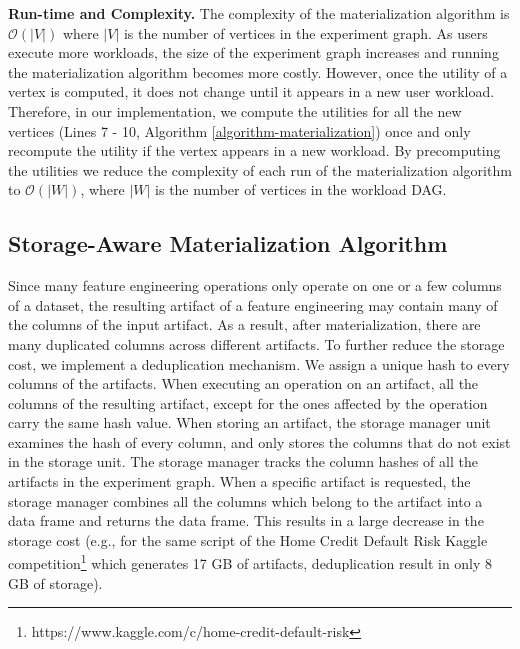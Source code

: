 \textbf{Run-time and Complexity.}
The complexity of the materialization algorithm is $\mathcal{O}(|V|)$ where $|V|$ is the number of vertices in the experiment graph.
As users execute more workloads, the size of the experiment graph increases and running the materialization algorithm becomes more costly.
However, once the utility of a vertex is computed, it does not change until it appears in a new user workload.
Therefore, in our implementation, we compute the utilities for all the new vertices (Lines 7 - 10, Algorithm \ref{algorithm-materialization}) once and only recompute the utility if the vertex appears in a new workload.
By precomputing the utilities we reduce the complexity of each run of the materialization algorithm to $\mathcal{O}(|W|)$, where $|W|$ is the number of vertices in the workload DAG.

\subsection{Storage-Aware Materialization Algorithm}
Since many feature engineering operations only operate on one or a few columns of a dataset, the resulting artifact of a feature engineering may contain many of the columns of the input artifact.
As a result, after materialization, there are many duplicated columns across different artifacts.
To further reduce the storage cost, we implement a deduplication mechanism.
We assign a unique hash to every columns of the artifacts.
When executing an operation on an artifact, all the columns of the resulting artifact, except for the ones affected by the operation carry the same hash value.
When storing an artifact, the storage manager unit examines the hash of every column, and only stores the columns that do not exist in the storage unit.
The storage manager tracks the column hashes of all the artifacts in the experiment graph.
When a specific artifact is requested, the storage manager combines all the columns which belong to the artifact into a data frame and returns the data frame.
This results in a large decrease in the storage cost (e.g., for the same script of the Home Credit Default Risk Kaggle competition\footnote{https://www.kaggle.com/c/home-credit-default-risk} which generates 17 GB of artifacts, deduplication result in only 8 GB of storage).

